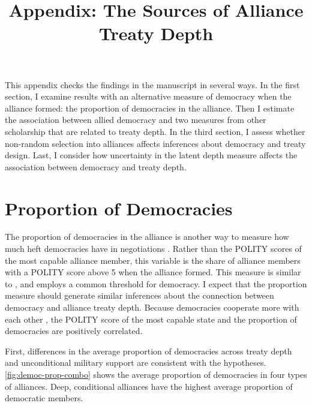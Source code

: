 \documentclass[12pt]{article}
\title{\textbf{Appendix: The Sources of Alliance Treaty Depth}}
\author{}
\date{}
\begin{document}
\maketitle 

\doublespace 

This appendix checks the findings in the manuscript in several ways. 
In the first section, I examine results with an alternative measure of democracy when the alliance formed: the proportion of democracies in the alliance. 
Then I estimate the association between allied democracy and two measures from other scholarship that are related to treaty depth.
In the third section, I assess whether non-random selection into alliances affects inferences about democracy and treaty design.   
Last, I consider how uncertainty in the latent depth measure affects the association between democracy and treaty depth. 


\section{Proportion of Democracies}


The proportion of democracies in the alliance is another way to measure how much heft democracies have in negotiations \cite{Chibaetal2015}.  
Rather than the POLITY scores of the most capable alliance member, this variable is the share of alliance members with a POLITY score above 5 when the alliance formed. 
This measure is similar to \citet{Chibaetal2015}, and employs a common threshold for democracy. 
I expect that the proportion measure should generate similar inferences about the connection between democracy and alliance treaty depth.
Because democracies cooperate more with each other \citep{Leeds1999}, the POLITY score of the most capable state and the proportion of democracies are positively correlated. 


First, differences in the average proportion of democracies across treaty depth and unconditional military support are consistent with the hypotheses. 
\autoref{fig:democ-prop-combo} shows the average proportion of democracies in four types of alliances. 
Deep, conditional alliances have the highest average proportion of democratic members.
\end{document}

